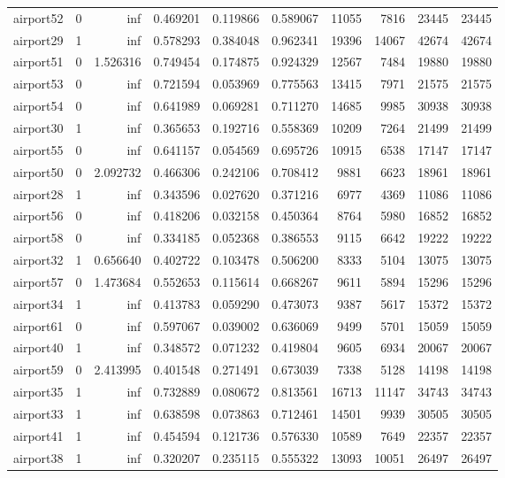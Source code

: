 \begin{longtable}{|l|r|r|r|r|r|r|r|r|r|}
airport52 & 0 & inf & 0.469201 & 0.119866 & 0.589067 & 11055 & 7816 & 23445 & 23445 \\
airport29 & 1 & inf & 0.578293 & 0.384048 & 0.962341 & 19396 & 14067 & 42674 & 42674 \\
airport51 & 0 & 1.526316 & 0.749454 & 0.174875 & 0.924329 & 12567 & 7484 & 19880 & 19880 \\
airport53 & 0 & inf & 0.721594 & 0.053969 & 0.775563 & 13415 & 7971 & 21575 & 21575 \\
airport54 & 0 & inf & 0.641989 & 0.069281 & 0.711270 & 14685 & 9985 & 30938 & 30938 \\
airport30 & 1 & inf & 0.365653 & 0.192716 & 0.558369 & 10209 & 7264 & 21499 & 21499 \\
airport55 & 0 & inf & 0.641157 & 0.054569 & 0.695726 & 10915 & 6538 & 17147 & 17147 \\
airport50 & 0 & 2.092732 & 0.466306 & 0.242106 & 0.708412 & 9881 & 6623 & 18961 & 18961 \\
airport28 & 1 & inf & 0.343596 & 0.027620 & 0.371216 & 6977 & 4369 & 11086 & 11086 \\
airport56 & 0 & inf & 0.418206 & 0.032158 & 0.450364 & 8764 & 5980 & 16852 & 16852 \\
airport58 & 0 & inf & 0.334185 & 0.052368 & 0.386553 & 9115 & 6642 & 19222 & 19222 \\
airport32 & 1 & 0.656640 & 0.402722 & 0.103478 & 0.506200 & 8333 & 5104 & 13075 & 13075 \\
airport57 & 0 & 1.473684 & 0.552653 & 0.115614 & 0.668267 & 9611 & 5894 & 15296 & 15296 \\
airport34 & 1 & inf & 0.413783 & 0.059290 & 0.473073 & 9387 & 5617 & 15372 & 15372 \\
airport61 & 0 & inf & 0.597067 & 0.039002 & 0.636069 & 9499 & 5701 & 15059 & 15059 \\
airport40 & 1 & inf & 0.348572 & 0.071232 & 0.419804 & 9605 & 6934 & 20067 & 20067 \\
airport59 & 0 & 2.413995 & 0.401548 & 0.271491 & 0.673039 & 7338 & 5128 & 14198 & 14198 \\
airport35 & 1 & inf & 0.732889 & 0.080672 & 0.813561 & 16713 & 11147 & 34743 & 34743 \\
airport33 & 1 & inf & 0.638598 & 0.073863 & 0.712461 & 14501 & 9939 & 30505 & 30505 \\
airport41 & 1 & inf & 0.454594 & 0.121736 & 0.576330 & 10589 & 7649 & 22357 & 22357 \\
airport38 & 1 & inf & 0.320207 & 0.235115 & 0.555322 & 13093 & 10051 & 26497 & 26497 \\

\end{longtable}

